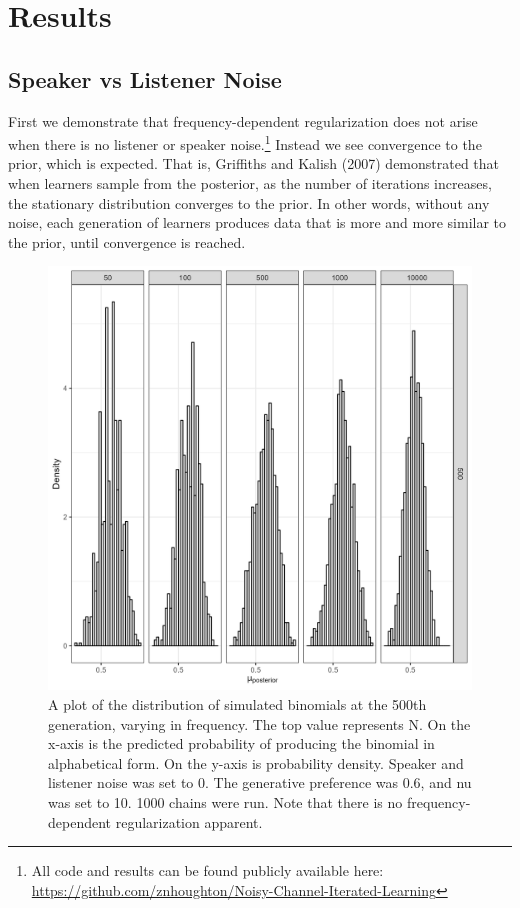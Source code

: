 \documentclass[
  jou,floatsintext]{apa6}
\begin{document}
\section{Results}\label{results}

\subsection{Speaker vs Listener Noise}\label{speaker-vs-listener-noise}

First we demonstrate that frequency-dependent regularization does not arise when there is no listener or speaker noise.\footnote{All code and results can be found publicly available here: \url{https://github.com/znhoughton/Noisy-Channel-Iterated-Learning}} Instead we see convergence to the prior, which is expected. That is, Griffiths and Kalish (2007) demonstrated that when learners sample from the posterior, as the number of iterations increases, the stationary distribution converges to the prior. In other words, without any noise, each generation of learners produces data that is more and more similar to the prior, until convergence is reached.



\begin{figure}

{\centering \includegraphics[width=1\linewidth]{Figures/noNoise} 

}

\caption{A plot of the distribution of simulated binomials at the 500th generation, varying in frequency. The top value represents N. On the x-axis is the predicted probability of producing the binomial in alphabetical form. On the y-axis is probability density. Speaker and listener noise was set to 0. The generative preference was 0.6, and nu was set to 10. 1000 chains were run. Note that there is no frequency-dependent regularization apparent.}\label{fig:noNoisePlot}
\end{figure}
\end{document}
